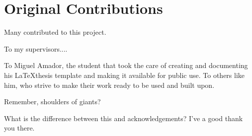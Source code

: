 \section{Original Contributions}
\label{sec:int_contributions}

Many contributed to this project. 

To my supervisors....

To Miguel Amador, the student that took the care of creating and documenting his \LaTeX thesis template and making it available for public use. To others like him, who strive to make their work ready to be used and built upon.

Remember, shoulders of giants?

What is the difference between this and acknowledgements? I've a good thank you there.
